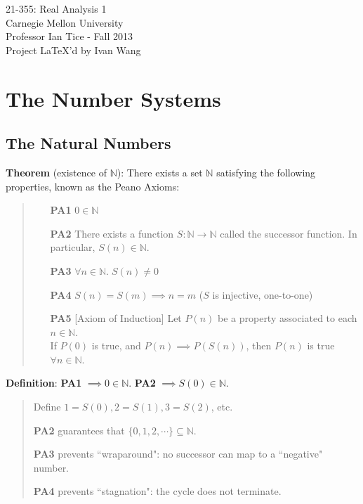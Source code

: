 \documentclass[11pt]{article}
\begin{document}
\begin{titlepage}
	\vspace*{\fill}
	\begin{center}
		{\Huge 21-355: Real Analysis 1}\\[0.5cm]
		{\Large Carnegie Mellon University}\\[0.3cm]
		{\Large Professor Ian Tice - Fall 2013}\\[2cm]
		 Project \LaTeX'd by Ivan Wang
	\end{center}
	\vspace*{\fill}
\end{titlepage}

\newpage

\tableofcontents
\newpage

\section{The Number Systems}

\subsection{The Natural Numbers}

\textbf{Theorem} (existence of $\mathbb{N}$): There exists a set $\mathbb{N}$ satisfying the following properties, known as the Peano Axioms:
\begin{quote}
	\begin{enumerate}
	\item[\bf PA1] $0 \in \mathbb{N}$
	
	\item [\bf PA2] There exists a function $S: \mathbb{N} \to \mathbb{N}$ called the successor function. In particular, $S(n) \in \mathbb{N}$.
	
	\item[\bf PA3] $\forall n \in \mathbb{N}.\; S(n) \neq 0$
	
	\item[\bf PA4] $S(n) = S(m) \implies n = m$ ($S$ is injective, one-to-one)

	\item[\bf PA5] [Axiom of Induction] Let $P(n)$ be a property associated to each $n \in \mathbb{N}$.\\
	If $P(0)$ is true, and $P(n) \implies P(S(n))$, then $P(n)$ is true $\forall n \in \mathbb{N}$.
	\end{enumerate}
\end{quote}

\textbf{Definition}: \textbf{PA1} $\implies 0 \in \mathbb{N}$. \textbf{PA2} $\implies S(0) \in \mathbb{N}$.
\begin{quote}\vspace{-0.3cm}
	Define $1 = S(0), 2 = S(1), 3 = S(2)$, etc.

	\textbf{PA2} guarantees that $\{0, 1, 2, \cdots\} \subseteq \mathbb{N}$.

	\textbf{PA3} prevents ``wraparound": no successor can map to a ``negative" number.

	\textbf{PA4} prevents ``stagnation": the cycle does not terminate.
\end{quote}
\end{document}
